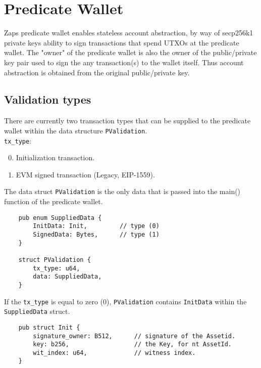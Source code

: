 \section{Predicate Wallet}
\label{sec:predi_wal}

Zaps predicate wallet enables stateless account abstraction, by way of secp256k1 private keys ability to sign transactions
that spend UTXOs at the predicate wallet. The "owner" of the predicate wallet is also the owner of the public/private
key pair used to sign the any transaction(s) to the wallet itself. Thus account abstraction is obtained from the original public/private
key. \\




\subsection{Validation types}

There are currently two transaction types that can be supplied to the predicate wallet within the data structure \texttt{PValidation}. \\


\texttt{tx\_type}:

\begin{enumerate}
    \setcounter{enumi}{-1} %
    \item Initialization transaction.
    \item EVM signed transaction (Legacy, EIP-1559).
\end{enumerate}


The data struct \texttt{PValidation} is the only data that is passed into the main() function of the predicate wallet.


\begin{small}
\begin{verbatim}
    pub enum SuppliedData {
        InitData: Init,         // type (0)
        SignedData: Bytes,      // type (1)
    }

    struct PValidation {
        tx_type: u64,
        data: SuppliedData,
    }
\end{verbatim}
\end{small}


If the \texttt{tx\_type} is equal to zero (0), \texttt{PValidation} contains \texttt{InitData} within the \texttt{SuppliedData} struct.

\begin{small} %
\begin{verbatim}
    pub struct Init {
        signature_owner: B512,      // signature of the Assetid.
        key: b256,                  // the Key, for nt AssetId.
        wit_index: u64,             // witness index.
    }
\end{verbatim}
\end{small}

